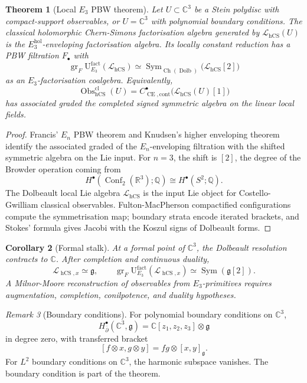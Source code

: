 \documentclass[11pt]{article}
\providecommand{\C}{\mathbb{C}}
\providecommand{\Q}{\mathbb{Q}}
\providecommand{\dbar}{\bar{\partial}}
\providecommand{\fg}{\mathfrak{g}}
\providecommand{\Sym}{\operatorname{Sym}}
\providecommand{\Obs}{\operatorname{Obs}}
\providecommand{\CE}{\operatorname{CE}}
\providecommand{\hCS}{\operatorname{hCS}}
\providecommand{\Ch}{\operatorname{Ch}}
\providecommand{\Dolb}{\operatorname{Dolb}}
\providecommand{\cL}{\mathcal{L}}
\theoremstyle{plain}
\newtheorem{theorem}{Theorem}[section]
\newtheorem{corollary}[theorem]{Corollary}
\theoremstyle{definition}
\theoremstyle{remark}
\newtheorem{remark}[theorem]{Remark}
\begin{document}
\begin{theorem}[Local \(E_3\) PBW theorem]
\label{thm:e3-pbw}
Let \(U\subset\C^3\) be a Stein polydisc with compact-support
observables, or \(U=\C^3\) with polynomial boundary conditions. The
classical holomorphic Chern-Simons
factorisation algebra generated by \(\cL_{\hCS}(U)\) is the
\(E_3^{\mathrm{hol}}\)-enveloping factorisation algebra. Its
locally constant reduction has a PBW filtration \(F_\bullet\) with
\[
  \operatorname{gr}_F
  \mathrm{U}^{\mathrm{fact}}_{E_3}(\cL_{\hCS})
  \simeq
  \Sym_{\Ch(\Dolb)}\bigl(\cL_{\hCS}[2]\bigr)
\]
as an \(E_3\)-factorisation coalgebra. Equivalently,
\[
  \Obs^{\mathrm{cl}}_{\hCS}(U)
  =
  C^\bullet_{\CE,\mathrm{cont}}\bigl(\cL_{\hCS}(U)[1]\bigr)
\]
has associated graded the completed signed symmetric algebra on the
linear local fields.
\end{theorem}

\begin{proof}
Francis' \(E_n\) PBW theorem and Knudsen's higher enveloping theorem
identify the associated graded of the \(E_n\)-enveloping filtration
with the shifted symmetric algebra on the Lie input. For \(n=3\), the
shift is \([2]\), the degree of the Browder operation coming from
\[
  H^\bullet(\operatorname{Conf}_2(\mathbb{R}^3);\Q)
  \cong H^\bullet(S^2;\Q).
\]
The Dolbeault local Lie algebra \(\cL_{\hCS}\) is the input Lie object
for Costello-Gwilliam classical observables. Fulton-MacPherson
compactified configurations compute the symmetrisation map; boundary
strata encode iterated brackets, and Stokes' formula gives Jacobi with
the Koszul signs of Dolbeault forms.
\end{proof}

\begin{corollary}[Formal stalk]
\label{cor:formal-stalk}
At a formal point of \(\C^3\), the Dolbeault resolution contracts to
\(\C\). After completion and continuous duality,
\[
  \cL_{\hCS,x}\simeq \fg,
  \qquad
  \operatorname{gr}_F\mathrm{U}^{\mathrm{fact}}_{E_3}(\cL_{\hCS,x})
  \simeq
  \Sym(\fg[2]).
\]
A Milnor-Moore reconstruction of observables from \(E_3\)-primitives
requires augmentation, completion, conilpotence, and duality
hypotheses.
\end{corollary}

\begin{remark}[Boundary conditions]
\label{rem:boundary-conditions}
For polynomial boundary conditions on \(\C^3\),
\[
  H^\bullet_{\dbar}(\C^3,\fg)=\C[z_1,z_2,z_3]\otimes\fg
\]
in degree zero, with transferred bracket
\[
  [f\otimes x,g\otimes y]=fg\otimes[x,y]_\fg.
\]
For \(L^2\) boundary conditions on \(\C^3\), the harmonic subspace
vanishes. The boundary condition is part of the theorem.
\end{remark}
\end{document}
